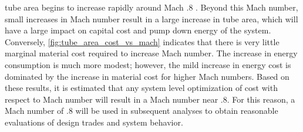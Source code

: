 tube area begins to increase rapidly around Mach .8 \cite{Chin}.
Beyond this Mach number, small increases in Mach number result in a large
increase in tube area, which will have a large impact on capital cost and pump
down energy of the system. Conversely, \cref{fig:tube_area_cost_vs_mach}
indicates that there is very little marginal material cost required to increase
Mach number. The increase in energy consumption is much more modest; however,
the mild increase in energy cost is dominated by the increase in material cost
for higher Mach numbers. Based on these results, it is estimated that any
system level optimization of cost with respect to Mach number will result in a
Mach number near .8. For this reason, a Mach number of .8 will be used in
subsequent analyses to obtain reasonable evaluations of design trades and system behavior.
